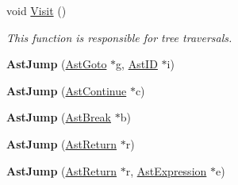 \begin{DoxyCompactItemize}
\item 
void \hyperlink{classAstJump_aca65cbe034ffdb439f6e3c73e40550ae}{Visit} ()
\begin{DoxyCompactList}\small\item\em This function is responsible for tree traversals. \end{DoxyCompactList}\item 
\hypertarget{classAstJump_a83a4aa905d84f3602374029976d99412}{{\bfseries Ast\-Jump} (\hyperlink{classAstGoto}{Ast\-Goto} $\ast$g, \hyperlink{classAstID}{Ast\-I\-D} $\ast$i)}\label{classAstJump_a83a4aa905d84f3602374029976d99412}

\item 
\hypertarget{classAstJump_a945a1bdc268bfa7f1fdd9f4d39bdef1a}{{\bfseries Ast\-Jump} (\hyperlink{classAstContinue}{Ast\-Continue} $\ast$c)}\label{classAstJump_a945a1bdc268bfa7f1fdd9f4d39bdef1a}

\item 
\hypertarget{classAstJump_a8b9e461b6a974f01889e89728afc7014}{{\bfseries Ast\-Jump} (\hyperlink{classAstBreak}{Ast\-Break} $\ast$b)}\label{classAstJump_a8b9e461b6a974f01889e89728afc7014}

\item 
\hypertarget{classAstJump_a083525b758ad6e931aee5ac850592730}{{\bfseries Ast\-Jump} (\hyperlink{classAstReturn}{Ast\-Return} $\ast$r)}\label{classAstJump_a083525b758ad6e931aee5ac850592730}

\item 
\hypertarget{classAstJump_ad80d35d23849aa369fef153fef4bb99e}{{\bfseries Ast\-Jump} (\hyperlink{classAstReturn}{Ast\-Return} $\ast$r, \hyperlink{classAstExpression}{Ast\-Expression} $\ast$e)}\label{classAstJump_ad80d35d23849aa369fef153fef4bb99e}


\end{DoxyCompactItemize}
